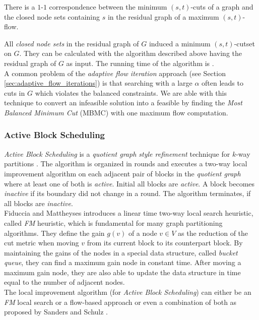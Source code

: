 \begin{theorem}
\label{theorem:mbmc}
There is a $1$-$1$ correspondence between the minimum $(s,t)$-cuts of a graph and the closed node
sets containing $s$ in the residual graph of a maximum $(s,t)$-flow.
\end{theorem}

All \emph{closed node sets} in the residual graph of $G$ induced a minimum $(s,t)$-cutset on $G$.
They can be calculated with the algorithm described above having the residual graph of
$G$ as input. The running time of the algorithm is . \\
A common problem of the \emph{adaptive flow iteration} approach (see Section \ref{sec:adaptive_flow_iterations}) is
that searching with a large $\alpha$ often leads to cuts in $G$ which violates the balanced constraints. 
We are able with this technique to convert an infeasible solution into a feasible by finding
the \emph{Most Balanced Minimum Cut} (MBMC) with one maximum flow computation. 


\subsubsection{Active Block Scheduling}
\label{sec:abs}
\emph{Active Block Scheduling} is a \emph{quotient graph style refinement} technique for
$k$-way partitions \cite{holtgrewe2010engineering,sanders2011engineering}. 
The algorithm is organized in rounds and executes a two-way 
local improvement algorithm on each adjacent pair of 
blocks in the \emph{quotient graph} where at least one of both is \emph{active}. 
Initial all blocks are \emph{active}. A block becomes \emph{inactive}
if its boundary did not change in a round. The algorithm
terminates, if all blocks are \emph{inactive}. \\
Fiduccia and Mattheyses \cite{fiduccia1988linear} introduces a linear time
two-way local search heuristic, called \emph{FM} heuristic, 
which is fundamental for many graph partitioning algorithms.
They define the gain $g(v)$ of a node $v \in V$ as the reduction of the cut metric when
moving $v$ from its current block to its counterpart block. By maintaining the gains of the
nodes in a special data structure, called \emph{bucket queue}, they can find a maximum
gain node in constant time. After moving a maximum gain node, they are also able to update the
data structure in time equal to the number of adjacent nodes.\\
The local improvement algorithm (for \emph{Active Block Scheduling}) can either 
be an \emph{FM} local search or a flow-based approach or even a combination of 
both as proposed by Sanders and Schulz \cite{sanders2011engineering}.

